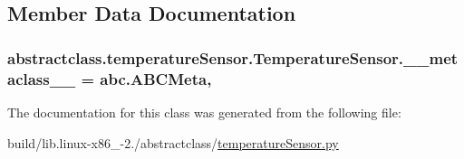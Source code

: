 \subsection{Member Data Documentation}
\hypertarget{classabstractclass_1_1temperatureSensor_1_1TemperatureSensor_a6b2c7e86d48c290ff86091185bf23b8a}{}
\subsubsection[{\+\_\+\+\_\+metaclass\+\_\+\+\_\+}]{\setlength{\rightskip}{0pt plus 5cm}abstractclass.\+temperature\+Sensor.\+Temperature\+Sensor.\+\_\+\+\_\+metaclass\+\_\+\+\_\+ = abc.\+A\+B\+C\+Meta\hspace{0.3cm}{\ttfamily [static]}, {\ttfamily [private]}}\label{classabstractclass_1_1temperatureSensor_1_1TemperatureSensor_a6b2c7e86d48c290ff86091185bf23b8a}


The documentation for this class was generated from the following file\+:\begin{DoxyCompactItemize}
\item 
build/lib.\+linux-\/x86\+\_-\/2./abstractclass/\hyperlink{build_2lib_8linux-x86__64-2_87_2abstractclass_2temperatureSensor_8py}{temperature\+Sensor.\+py}\end{DoxyCompactItemize}
